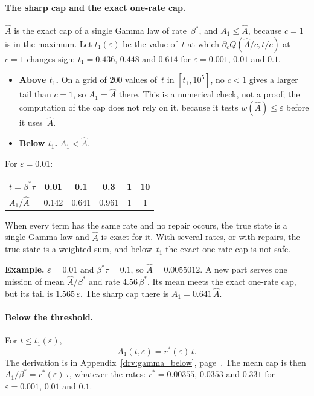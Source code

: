 \documentclass[11pt,a4paper]{article}
\theoremstyle{plain}
\theoremstyle{definition}
\theoremstyle{remark}
\begin{document}
\paragraph{The sharp cap and the exact one-rate cap.}
$\hat A$ is the exact cap of a single Gamma law of rate~$\beta^*$, and $A_1 \le \hat A$, because $c = 1$ is in the maximum.
Let $t_1(\varepsilon)$ be the value of~$t$ at which $\partial_c Q(\hat A/c, t/c)$ at $c = 1$ changes sign: $t_1 = 0.436$, $0.448$ and $0.614$ for $\varepsilon = 0.001$, $0.01$ and $0.1$.
\begin{itemize}
  \item \textbf{Above $t_1$.} On a grid of $200$ values of~$t$ in $[t_1, 10^5]$, no $c < 1$ gives a larger tail than $c = 1$, so $A_1 = \hat A$ there. This is a numerical check, not a proof; the computation of the cap does not rely on it, because it tests $w(\hat A) \le \varepsilon$ before it uses~$\hat A$.
  \item \textbf{Below $t_1$.} $A_1 < \hat A$.
\end{itemize}
For $\varepsilon = 0.01$:
\begin{center}
\small
\begin{tabular}{@{}lccccc@{}}
\toprule
\rowcolor{headgrey}
$t = \beta^*\tau$ & 0.01 & 0.1 & 0.3 & 1 & 10 \\
\midrule
$A_1/\hat A$ & 0.142 & 0.641 & 0.961 & 1 & 1 \\
\bottomrule
\end{tabular}
\end{center}
When every term has the same rate and no repair occurs, the true state is a single Gamma law and $\hat A$ is exact for it.
With several rates, or with repairs, the true state is a weighted sum, and below~$t_1$ the exact one-rate cap is not safe.

\begin{examplebox}
\textbf{Example.} $\varepsilon = 0.01$ and $\beta^*\tau = 0.1$, so $\hat A = 0.0055012$.
A new part serves one mission of mean $\hat A/\beta^*$ and rate $4.56\,\beta^*$.
Its mean meets the exact one-rate cap, but its tail is $1.565\,\varepsilon$.
The sharp cap there is $A_1 = 0.641\,\hat A$.
\end{examplebox}

\paragraph{Below the threshold.}
For $t \le t_1(\varepsilon)$,
\begin{equation}
  A_1(t, \varepsilon) = r^*(\varepsilon)\, t.
\end{equation}
The derivation is in Appendix~\ref{drv:gamma_below}, page~\pageref{drv:gamma_below}.
The mean cap is then $A_1/\beta^* = r^*(\varepsilon)\,\tau$, whatever the rates: $r^* = 0.00355$, $0.0353$ and $0.331$ for $\varepsilon = 0.001$, $0.01$ and $0.1$.
\end{document}

